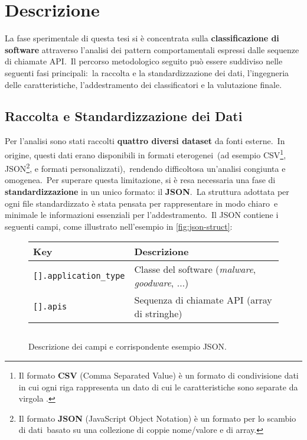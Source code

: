 \section{Descrizione}

La fase sperimentale di questa tesi si è concentrata sulla \textbf{classificazione di software} attraverso
l'analisi dei pattern comportamentali espressi dalle sequenze di chiamate API.\
Il percorso metodologico seguito può essere suddiviso nelle seguenti fasi principali:\
la raccolta e la standardizzazione dei dati, l'ingegneria delle caratteristiche, l'addestramento dei classificatori
e la valutazione finale.

\subsection{Raccolta e Standardizzazione dei Dati}

Per l'analisi sono stati raccolti \textbf{quattro diversi dataset} da fonti esterne.\
In origine, questi dati erano disponibili in formati eterogenei\
(ad esempio CSV\footnote{Il formato \textbf{CSV} (Comma Separated Value) è un formato di condivisione dati in cui ogni
    riga rappresenta un dato di cui le caratteristiche sono separate da virgola .},
JSON\footnote{Il formato \textbf{JSON} (JavaScript Object Notation) è un formato per lo scambio di dati\
    basato su una collezione di coppie nome/valore e di array.}, e formati personalizzati),\
rendendo difficoltosa un'analisi congiunta e omogenea.\
Per superare questa limitazione, si è resa necessaria una fase di \textbf{standardizzazione} in un unico formato:
il \textbf{JSON}.\
La struttura adottata per ogni file standardizzato è stata pensata per rappresentare in modo chiaro\
e minimale le informazioni essenziali per l'addestramento.\
Il JSON contiene i seguenti campi, come illustrato nell'esempio in \autoref{fig:json-struct}:

\begin{figure}[h!]
    \centering
    \renewcommand{\arraystretch}{1.3}
    \begin{tabular}{p{0.25\textwidth} p{0.65\textwidth}}
        \toprule
        \textbf{Key}                  & \textbf{Descrizione}                                           \\
        \midrule
        \texttt{[].application\_type} & Classe del software (\emph{malware}, \emph{goodware}, $\dots$) \\
        \texttt{[].apis}              & Sequenza di chiamate API (array di stringhe)                   \\
        \bottomrule
    \end{tabular}

    \vspace{4mm} %

    \inputminted[fontsize=\small]{json}{approccio-proposto/example.json}
    \caption{Descrizione dei campi e corrispondente esempio JSON.}
    \label{fig:json-struct}
\end{figure}

